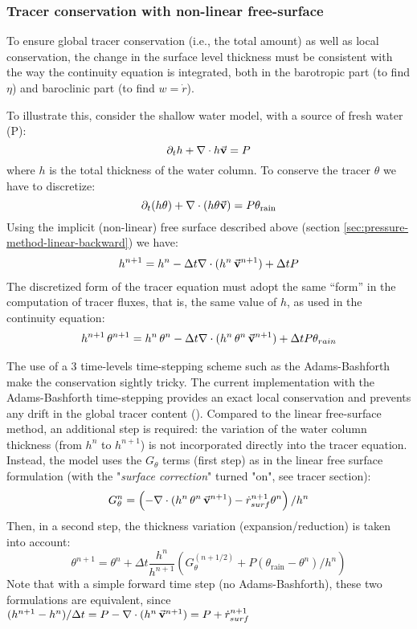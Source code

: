 \subsubsection{Tracer conservation with non-linear free-surface}
\label{sec:freesurf-tracer-advection}

To ensure global tracer conservation (i.e., the total amount) as well
as local conservation, the change in the surface level thickness must
be consistent with the way the continuity equation is integrated, both
in the barotropic part (to find $\eta$) and baroclinic part (to find
$w = \dot{r}$).

To illustrate this, consider the shallow water model, with a source
of fresh water (P):
$$
\partial_t h + \nabla \cdot h \vec{\bf v} = P
$$
where $h$ is the total thickness of the water column.
To conserve the tracer $\theta$ we have to discretize:
$$
\partial_t (h \theta) + \nabla \cdot ( h \theta \vec{\bf v})
  = P \theta_{\mathrm{rain}}
$$
Using the implicit (non-linear) free surface described above (section
\ref{sec:pressure-method-linear-backward}) we have:
\begin{eqnarray*}
h^{n+1} = h^{n} - \Delta t \nabla \cdot (h^n \, \vec{\bf v}^{n+1} ) + \Delta t P \\
\end{eqnarray*}
The discretized form of the tracer equation must adopt the same
``form'' in the computation of tracer fluxes, that is, the same value
of $h$, as used in the continuity equation:
\begin{eqnarray*}
h^{n+1} \, \theta^{n+1} = h^n \, \theta^n
        - \Delta t \nabla \cdot (h^n \, \theta^n \, \vec{\bf v}^{n+1})
        + \Delta t P \theta_{rain}
\end{eqnarray*}

The use of a 3 time-levels time-stepping scheme such as the Adams-Bashforth
make the conservation sightly tricky.
The current implementation with the Adams-Bashforth time-stepping
provides an exact local conservation and prevents any drift in
the global tracer content (\cite{campin:02}).
Compared to the linear free-surface method, an additional step is required:
the variation of the water column thickness (from $h^n$ to $h^{n+1}$) is
not incorporated directly into the tracer equation.  Instead, the
model uses the $G_\theta$ terms (first step) as in the linear free
surface formulation (with the "{\it surface correction}" turned "on",
see tracer section):
$$
G_\theta^n = \left(- \nabla \cdot (h^n \, \theta^n \, \vec{\bf v}^{n+1})
         - \dot{r}_{surf}^{n+1} \theta^n \right) / h^n
$$
Then, in a second step, the thickness variation (expansion/reduction)
is taken into account:
$$
\theta^{n+1} = \theta^n + \Delta t \frac{h^n}{h^{n+1}}
   \left( G_\theta^{(n+1/2)} + P (\theta_{\mathrm{rain}} - \theta^n )/h^n \right)
$$
Note that with a simple forward time step (no Adams-Bashforth),
these two formulations are equivalent,
since
$
(h^{n+1} - h^{n})/ \Delta t =
P - \nabla \cdot (h^n \, \vec{\bf v}^{n+1} ) = P + \dot{r}_{surf}^{n+1}
$

